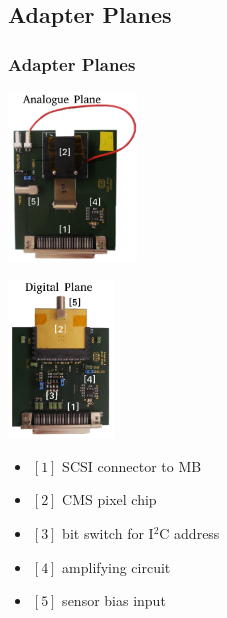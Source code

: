 \documentclass[9pt]{beamer}
\begin{document}
\subsection{Adapter Planes}
\begin{frame}
	\frametitle{Adapter Planes}
	\begin{center}
		\begin{minipage}{5.5cm}
			\centering
			\includegraphics[width=3.4cm]{Pics/AdapterAnalog}
		\end{minipage}
		\hspace*{2pt}
		\begin{minipage}{5.5cm}
			\centering
			\includegraphics[width=2.8cm]{Pics/AdapterDigital}
		\end{minipage}
	\end{center}
	\begin{itemize}
		\item $[1]$ SCSI connector to MB
		\item $[2]$ CMS pixel chip
		\item $[3]$ bit switch for I$^{2}$C address
		\item $[4]$ amplifying circuit
		\item $[5]$ sensor bias input
	\end{itemize}
\end{frame}
\end{document}
